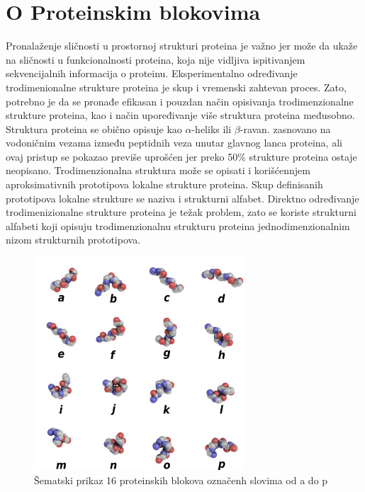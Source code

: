 \documentclass[a4paper,12pt]{article}
\begin{document}
\section{O Proteinskim blokovima}
Pronalaženje sličnosti u prostornoj strukturi proteina je važno jer može da ukaže na sličnosti u funkcionalnosti proteina, koja nije vidljiva ispitivanjem sekvencijalnih informacija o proteinu. Eksperimentalno određivanje trodimenionalne strukture proteina je skup i vremenski zahtevan proces. Zato, potrebno je da se pronađe efikasan i pouzdan način opisivanja trodimenzionalne strukture proteina, kao i način upoređivanje više struktura proteina međusobno.
\\
Struktura proteina se obično opisuje kao $\alpha$-heliks ili $\beta$-ravan. zasnovano na vodoničnim vezama između peptidnih veza unutar glavnog lanca proteina, ali ovaj pristup se pokazao previše uprošćen jer preko 50\% strukture proteina ostaje neopisano.\cite{debrevern2010proteinblocks}
Trodimenzionalna struktura može se opisati i korišćennjem aproksimativnih prototipova lokalne strukture proteina. Skup definisanih prototipova lokalne strukture se naziva i strukturni alfabet. Direktno određivanje trodimenizionalne strukture proteina je težak problem, zato se koriste strukturni alfabeti koji opisuju trodimenzionalnu strukturu proteina jednodimenzionalnim nizom strukturnih prototipova. 

\begin{figure}[h!]
    \centering
    \includegraphics[width=0.7\textwidth]{./images/PBs.jpg}
    \caption{Šematski prikaz 16 proteinskih blokova označenh slovima od a do p}
    \label{Slika:pbs}
\end{figure}
\end{document}
